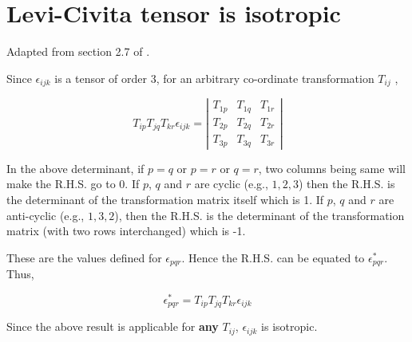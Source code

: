 \section{Levi-Civita tensor is isotropic}
\label{levicivitaisotropic}

Adapted from section 2.7 of \cite{aris}.

Since $\epsilon_{ijk}$ is a tensor of order 3, for an arbitrary co-ordinate transformation $T_{ij}$ ,


\begin{equation}
T_{ip} T_{jq} T_{kr} \epsilon_{ijk} = \left|
\begin{array}{ccc}
T_{1p} & T_{1q} & T_{1r} \\
T_{2p} & T_{2q} & T_{2r} \\
T_{3p} & T_{3q} & T_{3r}
\end{array}
\right|
\end{equation}

In the above determinant, if $p=q$ or $p=r$ or $q=r$, two columns being same will make the R.H.S. go to 0.
If $p$, $q$ and $r$ are cyclic (e.g., $1,2,3$) then the R.H.S. is the determinant of the transformation matrix itself which is 1.
If $p$, $q$ and $r$ are anti-cyclic (e.g., $1,3,2$), then the R.H.S. is the determinant of the transformation matrix (with two rows interchanged) which is -1.

These are the values defined for $\epsilon_{pqr}$. Hence the R.H.S. can be equated to $\epsilon_{pqr}^*$. Thus,

$$\epsilon_{pqr}^* = T_{ip} T_{jq} T_{kr} \epsilon_{ijk} $$

Since the above result is applicable for {\bf any} $T_{ij}$, $\epsilon_{ijk}$ is isotropic.


